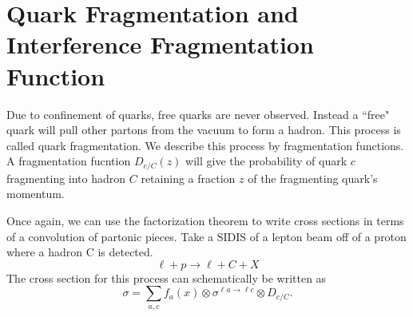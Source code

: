 \documentclass[abstract = on,listof=totoc, bibliography=totoc]{scrreprt}
\begin{document}
%

\section{Quark Fragmentation and Interference Fragmentation Function}
Due to confinement of quarks, free quarks are never observed. Instead a ``free" quark will pull other partons from the vacuum to form a hadron. This process is called quark fragmentation. We describe this process by fragmentation functions. A fragmentation fucntion $D_{c/C}(z)$ will give the probability of quark $c$ fragmenting into hadron $C$ retaining a fraction $z$ of the fragmenting quark's momentum.

Once again, we can use the factorization theorem to write cross sections in terms of a convolution of partonic pieces. Take a SIDIS of a lepton beam off of a proton where a hadron C is detected.
\begin{equation}
\ell + p \rightarrow \ell + C + X
\end{equation}
The cross section for this process can schematically be written as 
\begin{equation}
\sigma = \sum\limits_{a,c}f_a(x) \otimes \sigma^{\ell a\rightarrow\ell c} \otimes D_{c/C}.
\end{equation}

\end{document}
